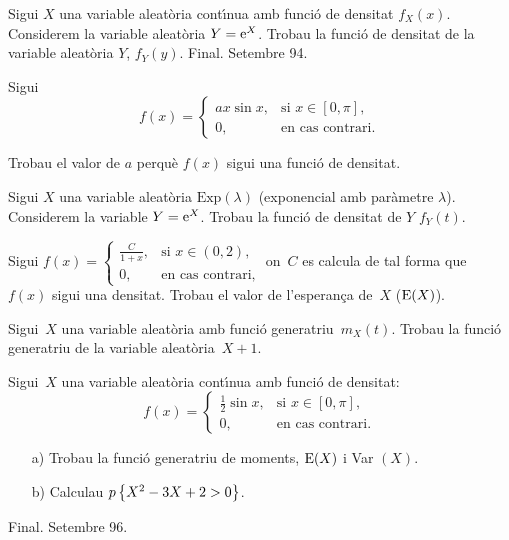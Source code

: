 \enlargethispage*{1000pt}

\begin{prob}
{Sigui $X$ una variable aleat\`oria cont\'{\i}nua amb funci\'o de densitat
$f_X(x)$.
Considerem la variable aleat\`oria $Y={\rm e}^X$. Trobau la funci\'o de densitat
de la variable aleat\`oria $Y$, $f_Y(y)$.
\newline\hfill{\footnotesize Final.
Setembre 94.}}
\end{prob}

\newpage

\begin{prob}
{
Sigui 
\[
f(x)= 
\left\{
\begin{array}{ll}
ax \sin x, & \text{si $x\in [0,\pi]$},\\
 0, & \text{en cas contrari.}
\end{array}
\right.
\]

Trobau el valor de $a$ perqu\`e $f(x)$ sigui una funci\'o de densitat.
}
\end{prob}

\begin{prob}
{
Sigui $X$ una variable aleat\`oria $\mbox{Exp}(\lambda)$ (exponencial amb
par\`ametre $\lambda$). Considerem la variable $Y={\rm e}^X$. Trobau la funci\'o de
densitat de $Y$  $f_Y(t)$. 
}
\end{prob}

\begin{prob}
{
Sigui $f(x)=
\left\{\begin{array}{ll}
\frac{C}{1+x},&\mbox{si $x\in (0,2)$},\\
0,& \mbox{en cas contrari,}
\end{array}\right.
$
on~$C$ es calcula de tal forma que~$f(x)$ sigui una densitat.
Trobau el valor de l'esperan\c{c}a de~$X$ (${\rm E} (X)$).
}
\end{prob}

\begin{prob}
{
Sigui~$X$ una variable aleat\`oria amb funci\'o generatriu~$m_X(t)$. Trobau
la funci\'o generatriu de la variable aleat\`oria~$X+1$.
}
\end{prob}

\begin{prob}
{
Sigui~$X$ una variable aleat\`oria cont\'{\i}nua
amb funci\'o de densitat:
\[
f(x)=
\left\{
\begin{array}{ll}
\frac{1}{2}\sin x, & \mbox{si $x\in [0,\pi]$},\\
0, & \mbox{en cas contrari.}
\end{array}
\right.
\]
\begin{itemize}
\item[a)] Trobau la funci\'o generatriu de moments, ${\rm E} (X)$ i Var $(X)$.
\item[b)] Calculau $p\left\{X^2 -3 X +2>0\right\}$.
\end{itemize}
{\footnotesize Final. Setembre 96.}
}
\end{prob}

